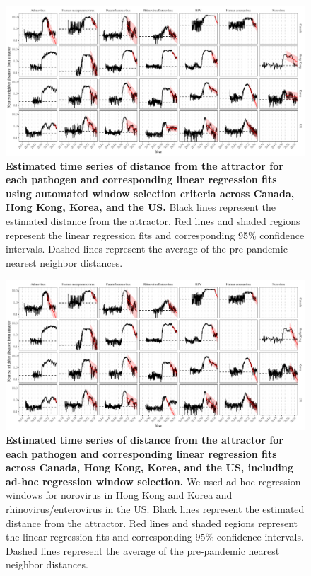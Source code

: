 \documentclass[12pt]{article}
\begin{document}
\begin{figure}[!th]
\includegraphics[width=\textwidth]{../figure4/figure4_dist_auto.pdf}
\caption{
\textbf{Estimated time series of distance from the attractor for each pathogen and corresponding linear regression fits using automated window selection criteria across Canada, Hong Kong, Korea, and the US.}
Black lines represent the estimated distance from the attractor.
Red lines and shaded regions represent the linear regression fits and corresponding 95\% confidence intervals.
Dashed lines represent the average of the pre-pandemic nearest neighbor distances.
}
\end{figure}

\pagebreak

\begin{figure}[!th]
\includegraphics[width=\textwidth]{../figure4/figure4_dist.pdf}
\caption{
\textbf{Estimated time series of distance from the attractor for each pathogen and corresponding linear regression fits across Canada, Hong Kong, Korea, and the US, including ad-hoc regression window selection.}
We used ad-hoc regression windows for norovirus in Hong Kong and Korea and rhinovirus/enterovirus in the US.
Black lines represent the estimated distance from the attractor.
Red lines and shaded regions represent the linear regression fits and corresponding 95\% confidence intervals.
Dashed lines represent the average of the pre-pandemic nearest neighbor distances.
}
\end{figure}
\end{document}
